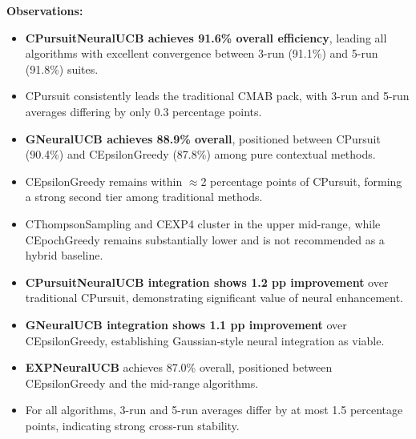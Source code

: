 \documentclass[12pt,a4paper]{article}
\newcommand{\legacy}[1]{\textcolor{legacycolor}{\textbf{#1}}}
\newcommand{\neural}[1]{\textcolor{neuralcolor}{\textbf{#1}}}
\begin{document}
\begin{tcolorbox}[colback=performancecolor!10,colframe=performancecolor,title=\textbf{Primary Performance Results (Aggregated Across Capacities, Environments, and Regimes)}]
\textbf{Observations:}
\begin{itemize}
\item \neural{CPursuitNeuralUCB achieves 91.6\% overall efficiency}, leading all algorithms with excellent convergence between 3-run (91.1\%) and 5-run (91.8\%) suites.
\item CPursuit consistently leads the traditional CMAB pack, with 3-run and 5-run averages differing by only 0.3 percentage points.
\item \neural{GNeuralUCB achieves 88.9\% overall}, positioned between CPursuit (90.4\%) and CEpsilonGreedy (87.8\%) among pure contextual methods.
\item CEpsilonGreedy remains within $\approx$2 percentage points of CPursuit, forming a strong second tier among traditional methods.
\item CThompsonSampling and CEXP4 cluster in the upper mid-range, while CEpochGreedy remains substantially lower and is not recommended as a hybrid baseline.
\item \neural{CPursuitNeuralUCB integration shows 1.2 pp improvement} over traditional CPursuit, demonstrating significant value of neural enhancement.
\item \neural{GNeuralUCB integration shows 1.1 pp improvement} over CEpsilonGreedy, establishing Gaussian-style neural integration as viable.
\item \legacy{EXPNeuralUCB} achieves 87.0\% overall, positioned between CEpsilonGreedy and the mid-range algorithms.
\item For all algorithms, 3-run and 5-run averages differ by at most 1.5 percentage points, indicating strong cross-run stability.
\end{itemize}

\end{tcolorbox}
\end{document}
